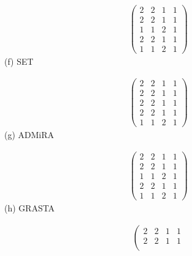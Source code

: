 \documentclass[twocolumn]{svjour3}
\begin{document}
\begin{figure*}[ht]
\hspace{1.5cm}\begin{minipage}[c]{0.15\linewidth}
\centering
\begin{align}
\left( \begin{array}{cccc}
2 & 2 & 1 & 1 \\
2 & 2 & 1 & 1 \\
1 & 1 & 2 & 1 \\
2 & 2 & 1 & 1 \\
1 & 1 & 2 & 1 \end{array} \right) \nonumber 
\end{align} \hspace{-1.1cm} (f) SET
\end{minipage}
\hspace{0.4cm}
\begin{minipage}[c]{0.15\linewidth}
\centering
\begin{align}
\left( \begin{array}{cccc}
2 & 2 & 1 & 1 \\
2 & 2 & 1 & 1 \\
2 & 2 & 1 & 1 \\
2 & 2 & 1 & 1 \\
1 & 1 & 2 & 1 \end{array} \right) \nonumber 
\end{align} \hspace{-1.1cm} (g) ADMiRA
\end{minipage}
\hspace{0.4cm}
\begin{minipage}[c]{0.15\linewidth}
\centering
\begin{align}
\left( \begin{array}{cccc}
2 & 2 & 1 & 1 \\
2 & 2 & 1 & 1 \\
1 & 1 & 2 & 1 \\
2 & 2 & 1 & 1 \\
1 & 1 & 2 & 1 \end{array} \right) \nonumber 
\end{align} \hspace{-1.1cm} (h) GRASTA
\end{minipage}
\hspace{0.4cm}
\begin{minipage}[c]{0.15\linewidth}
\centering
\begin{align}
\left( \begin{array}{cccc}
2 & 2 & 1 & 1 \\
2 & 2 & 1 & 1 \\

\end{array}
\end{align}
\end{minipage}
\end{figure*}
\end{document}
